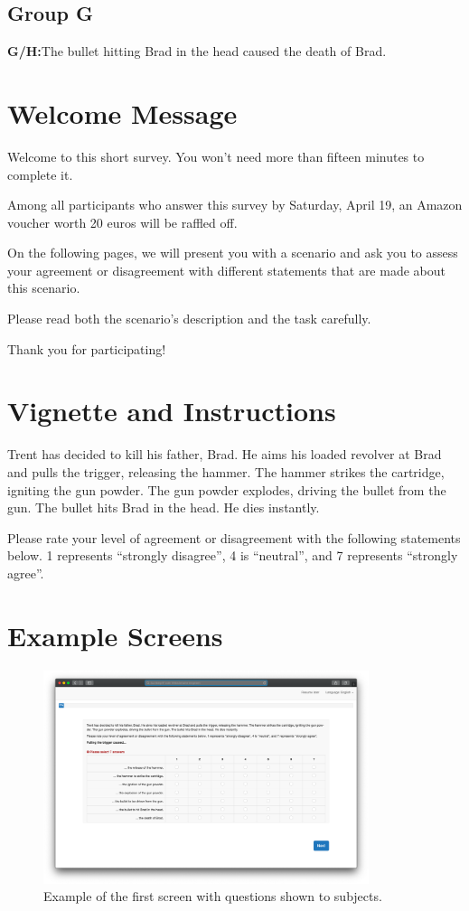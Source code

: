 \documentclass[12pt]{scrartcl}
\begin{document}
\subsection*{Group G}
\noindent\textbf{\textsf{G/H:}}\tab The bullet hitting Brad in the head caused the death of Brad.

\section{Welcome Message}
\label{app:welcome}
Welcome to this short survey. You won't need more than fifteen minutes to complete it.

Among all participants who answer this survey by Saturday, April 19, an Amazon voucher worth 20 euros will be raffled off.

On the following pages, we will present you with a scenario and ask you to assess your agreement or disagreement with different statements that are made about this scenario.

Please read both the scenario's description and the task carefully.

Thank you for participating!

\section{Vignette and Instructions}
\label{app:vignette}
Trent has decided to kill his father, Brad. He aims his loaded revolver at Brad and pulls the trigger, releasing the hammer. The hammer strikes the cartridge, igniting the gun powder. The gun powder explodes, driving the bullet from the gun. The bullet hits Brad in the head. He dies instantly.

Please rate your level of agreement or disagreement with the following statements below. 1 represents \enquote{strongly disagree}, 4 is \enquote{neutral}, and 7 represents \enquote{strongly agree}.

\section{Example Screens}
\label{app:screens}
\begin{figure}[H]
   \centering
   \includegraphics[width=0.85\textwidth]{screen_1.png}
   \caption{Example of the first screen with questions shown to subjects.}
   \label{fig:screen_1}
\end{figure}
\end{document}
